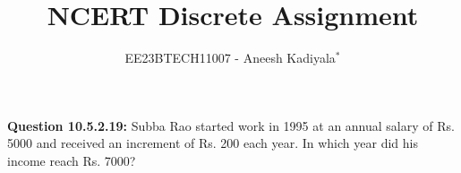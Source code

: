 \documentclass[journal,12pt,twocolumn]{IEEEtran}
\theoremstyle{remark}
\begin{document}

\vspace{3cm}

\title{NCERT Discrete Assignment}
\author{EE23BTECH11007 - Aneesh Kadiyala$^{*}$%
}
\maketitle
\newpage
\bigskip

\renewcommand{\thefigure}{\theenumi}
\renewcommand{\thetable}{\theenumi}

\vspace{3cm}
\textbf{Question 10.5.2.19:} Subba Rao started work in 1995 at an annual salary of Rs. 5000 and received an increment of Rs. 200 each year. In which year did his income reach Rs. 7000?
\\
\solution
\end{document}
